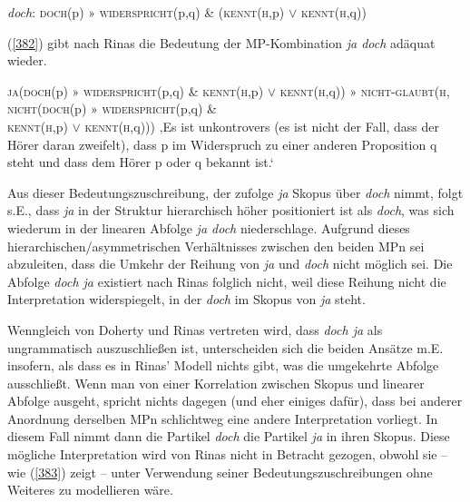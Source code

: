 \begin{exe}
	\ex\label{381} 	
	\textit{doch}: \textsc{doch}(p) » \textsc{widerspricht}(p,q) \& (\textsc{kennt}(\textsc{h},p) $\lor$ \textsc{kennt}(\textsc{h},q))
	\newline
	\hbox{}\hfill\hbox{\citet[425/420]{Rinas2007}}	
\end{exe}
(\ref{382}) gibt nach Rinas die Bedeutung der MP-Kombination \textit{ja doch} adäquat wieder.
\begin{exe}{\sloppy
	\ex\label{382} 
		\begin{xlist}	
			\ex\label{382a} \textsc{ja}(\textsc{doch}(p) » \textsc{widerspricht}(p,q) \& \textsc{kennt}(\textsc{h},p) $\lor$ \textsc{kennt}(\textsc{h},q))
				» \textsc{nicht-glaubt}(\textsc{h}, \textsc{nicht}(\textsc{doch}(p) » \textsc{widerspricht}(p,q) \& \\ \textsc{kennt}(\textsc{h},p) $\lor$ \textsc{kennt}(\textsc{h},q)))
			\ex\label{382b} ‚Es ist unkontrovers (es ist nicht der Fall, dass der Hörer daran zweifelt), dass p im 							Widerspruch zu einer anderen Proposition q steht und dass dem Hörer p oder q bekannt ist.‘ 
			\hfill\hbox{\citet[431]{Rinas2007}}
		\end{xlist}
}\end{exe}
Aus dieser Bedeutungszuschreibung, der zufolge \textit{ja} Skopus über \textit{doch} nimmt, folgt s.E., dass \textit{ja} in der Struktur hierarchisch höher positioniert ist als \textit{doch}, was sich wiederum in der linearen Abfolge \textit{ja doch} niederschlage. Aufgrund dieses hierarchischen/asymmetrischen Verhältnisses zwischen den beiden MPn sei abzuleiten, dass die Umkehr der Reihung von \textit{ja} und \textit{doch} nicht möglich sei. Die Abfolge \textit{doch ja} existiert nach Rinas folglich nicht, weil diese Reihung nicht die Interpretation widerspiegelt, in der \textit{doch} im Skopus von \textit{ja} steht.

Wenngleich von Doherty und Rinas vertreten wird, dass \textit{doch ja} als ungrammatisch auszuschließen ist, unterscheiden sich die beiden Ansätze m.E. insofern, als dass es in Rinas' Modell nichts gibt, was die umgekehrte Abfolge ausschließt. Wenn man von einer Korrelation zwischen Skopus und linearer Abfolge ausgeht, spricht nichts dagegen (und eher einiges dafür), dass bei anderer Anordnung derselben MPn schlichtweg eine andere Interpretation vorliegt. In diesem Fall nimmt dann die Partikel \textit{doch} die Partikel \textit{ja} in ihren Skopus. Diese mögliche Interpretation wird von Rinas nicht in Betracht gezogen, obwohl sie – wie (\ref{383}) zeigt – unter Verwendung seiner Bedeutungszuschreibungen ohne Weiteres zu modellieren wäre.

